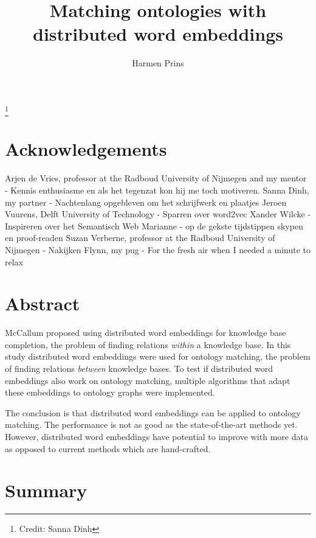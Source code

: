\documentclass{article}
\title{Matching ontologies with distributed word embeddings}
\author{Harmen Prins}
\begin{document}
 \maketitle
 
 \footnote{Credit: Sanna Dinh}
 \newpage
 
 \section*{Acknowledgements}
 Arjen de Vries, professor at the Radboud University of Nijmegen and my mentor - Kennis enthusiasme en als het tegenzat kon hij me toch motiveren.
 Sanna Dinh, my partner - Nachtenlang opgebleven om het schrijfwerk en plaatjes
 Jeroen Vuurens, Delft University of Technology - Sparren over word2vec
 Xander Wilcke - Inspireren over het Semantisch Web
 Marianne - op de gekste tijdstippen skypen en proof-readen
 Suzan Verberne, professor at the Radboud University of Nijmegen - Nakijken
 Flynn, my pug - For the fresh air when I needed a minute to relax
 
 \section*{Abstract}
 McCallum proposed using distributed word embeddings for knowledge base completion, the problem of finding relations \textit{within} a knowledge base. In this study distributed word embeddings were used for ontology matching, the problem of finding relations \textit{between} knowledge bases. To test if distributed word embeddings also work on ontology matching, multiple algorithms that adapt these embeddings to ontology graphs were implemented.
 
 The conclusion is that distributed word embeddings can be applied to ontology matching. The performance is not as good as the state-of-the-art methods yet. However, distributed word embeddings have potential to improve with more data as opposed to current methods which are hand-crafted.
 
 \section*{Summary}
 \tableofcontents
 \newpage
 
 
\end{document}
